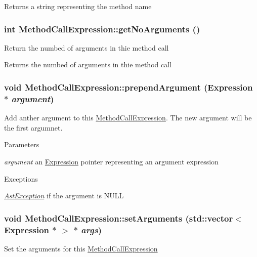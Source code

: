 \begin{DoxyReturn}{Returns}
a string representing the method name 
\end{DoxyReturn}
\hypertarget{classMethodCallExpression_ac827bda72aa7edd546dc70ba7e4dea7a}{
\subsubsection[{getNoArguments}]{\setlength{\rightskip}{0pt plus 5cm}int MethodCallExpression::getNoArguments ()}}
\label{classMethodCallExpression_ac827bda72aa7edd546dc70ba7e4dea7a}
Return the numbed of arguments in thie method call

\begin{DoxyReturn}{Returns}
the numbed of arguments in thie method call 
\end{DoxyReturn}
\hypertarget{classMethodCallExpression_a1930d4df840960e60304da85acc70b63}{
\subsubsection[{prependArgument}]{\setlength{\rightskip}{0pt plus 5cm}void MethodCallExpression::prependArgument ({\bf Expression} $\ast$ {\em argument})}}
\label{classMethodCallExpression_a1930d4df840960e60304da85acc70b63}
Add anther argument to this \hyperlink{classMethodCallExpression}{MethodCallExpression}. The new argument will be the first argumnet.


\begin{DoxyParams}{Parameters}
\item[{\em argument}]an \hyperlink{classExpression}{Expression} pointer representing an argument expression \end{DoxyParams}

\begin{DoxyExceptions}{Exceptions}
\item[{\em \hyperlink{classAstException}{AstException}}]if the argument is NULL \end{DoxyExceptions}
\hypertarget{classMethodCallExpression_a31c2b10a2914b5a71d16feab9bb96d34}{
\subsubsection[{setArguments}]{\setlength{\rightskip}{0pt plus 5cm}void MethodCallExpression::setArguments (std::vector$<$ {\bf Expression} $\ast$ $>$ $\ast$ {\em args})}}
\label{classMethodCallExpression_a31c2b10a2914b5a71d16feab9bb96d34}
Set the arguments for this \hyperlink{classMethodCallExpression}{MethodCallExpression}



